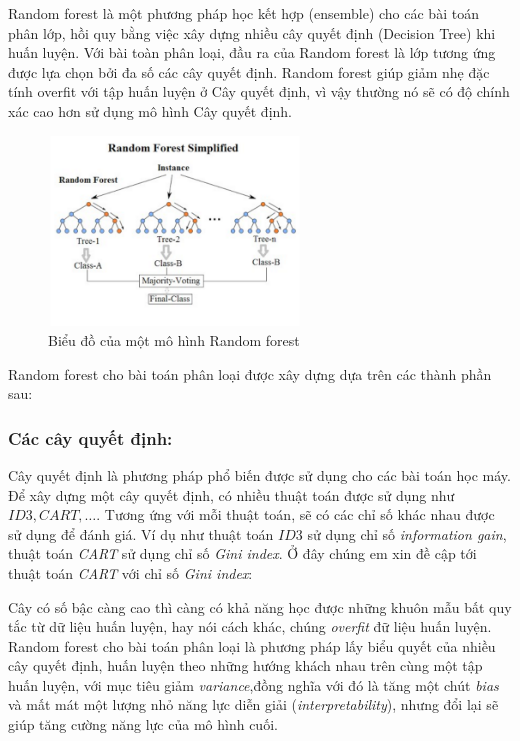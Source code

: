 Random forest là một phương pháp học kết hợp (ensemble) cho các bài toán phân lớp, hồi quy bằng việc xây dựng nhiều cây quyết định (Decision Tree) khi huấn luyện. Với bài toàn phân loại, đầu ra của Random forest là lớp tương ứng được lựa chọn bởi đa số các cây quyết định. Random forest giúp giảm nhẹ đặc tính overfit với tập huấn luyện ở Cây quyết định, vì vậy thường nó sẽ có độ chính xác cao hơn sử dụng mô hình Cây quyết định.

\begin{figure}[h!]
    \centering
    \includegraphics[width=0.6\textwidth]{figures/Random_forest_diagram_complete.png} %
    \caption{Biểu đồ của một mô hình Random forest} %
    \label{fig:2} %
\end{figure}

Random forest cho bài toán phân loại được xây dựng dựa trên các thành phần sau:
\subsubsection{Các cây quyết định:}
Cây quyết định là phương pháp phổ biến được sử dụng cho các bài toán học máy. 
Để xây dựng một cây quyết định, có nhiều thuật toán được sử dụng như $ID3, CART,\dots$. Tương ứng với mỗi thuật toán, sẽ có các chỉ số khác nhau được sử dụng để đánh giá. Ví dụ như thuật toán $ID3$ sử dụng chỉ số \emph{information gain}, thuật toán \emph{CART} sử dụng chỉ số \emph{Gini index}. Ở đây chúng em xin đề cập tới thuật toán \emph{CART} với chỉ số \emph{Gini index}:

Cây có số bậc càng cao thì càng có khả năng học được những khuôn mẫu bất quy tắc từ dữ liệu huấn luyện, hay nói cách khác, chúng \emph{overfit} đữ liệu huấn luyện. Random forest cho bài toán phân loại là phương pháp lấy biểu quyết của nhiều cây quyết định, huấn luyện theo những hướng khách nhau trên cùng một tập huấn luyện, với mục tiêu giảm \emph{variance},đồng nghĩa với đó là tăng một chút \emph{bias} và mất mát một lượng nhỏ năng lực diễn giải (\emph{interpretability}), nhưng đổi lại sẽ giúp tăng cường năng lực của mô hình cuối.
